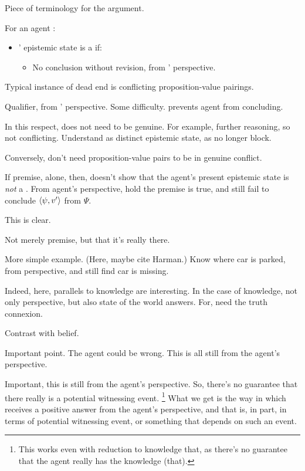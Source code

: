 \begin{note}[A \deadEnd{}]
  Piece of terminology for the argument.

  \begin{definition}[A \deadEnd{0}]
    \label{def:dead-end}
    For an agent \vAgent{}:

    \begin{itemize}
    \item
      \vAgent{}' epistemic state is a \emph{} if:
      \begin{itemize}
      \item
        No conclusion without revision, from \vAgent{}' perspective.
      \end{itemize}
    \end{itemize}
    \vspace{-\baselineskip}
  \end{definition}

  Typical instance of dead end is conflicting proposition-value pairings.

  Qualifier, from \vAgent{}' perspective.
  Some difficulty.
  \deadEnd{} prevents agent from concluding.

  In this respect, \deadEnd{} does not need to be genuine.
  For example, further reasoning, so not conflicting.
  Understand as distinct epistemic state, as no longer block.

  Conversely, don't need proposition-value pairs to be in genuine conflict.
\end{note}


\begin{note}
  \begin{argument}
    If premise, alone, then, doesn't show that the agent's present epistemic state is \emph{not} a \deadEnd{}.
    From agent's perspective, hold the premise is true, and still fail to conclude \(\langle \psi, v' \rangle\) from \(\Psi\).

    This is clear.

    Not merely premise, but that it's really there.

    More simple example.
    (Here, maybe cite Harman.)
    Know where car is parked, from perspective, and still find car is missing.

    Indeed, here, parallels to knowledge are interesting.
    In the case of knowledge, not only perspective, but also state of the world answers.
    For, need the truth connexion.

    Contrast with belief.

    Important point.
    The agent could be wrong.
    This is all still from the agent's perspective.
  \end{argument}

  Important, this is still from the agent's perspective.
  So, there's no guarantee that there really is a potential witnessing event.%
  \footnote{
    This works even with reduction to knowledge that, as there's no guarantee that the agent really has the knowledge (that).
  }
  What we get is the way in which \qzS{} receives a positive answer from the agent's perspective, and that is, in part, in terms of potential witnessing event, or something that depends on such an event.
\end{note}

